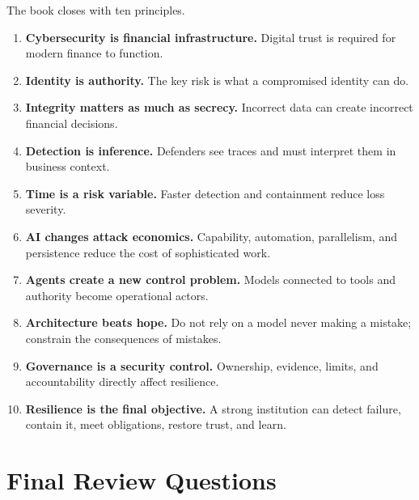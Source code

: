 The book closes with ten principles.

\begin{enumerate}
    \item \textbf{Cybersecurity is financial infrastructure.} Digital trust is required for modern finance to function.
    \item \textbf{Identity is authority.} The key risk is what a compromised identity can do.
    \item \textbf{Integrity matters as much as secrecy.} Incorrect data can create incorrect financial decisions.
    \item \textbf{Detection is inference.} Defenders see traces and must interpret them in business context.
    \item \textbf{Time is a risk variable.} Faster detection and containment reduce loss severity.
    \item \textbf{AI changes attack economics.} Capability, automation, parallelism, and persistence reduce the cost of sophisticated work.
    \item \textbf{Agents create a new control problem.} Models connected to tools and authority become operational actors.
    \item \textbf{Architecture beats hope.} Do not rely on a model never making a mistake; constrain the consequences of mistakes.
    \item \textbf{Governance is a security control.} Ownership, evidence, limits, and accountability directly affect resilience.
    \item \textbf{Resilience is the final objective.} A strong institution can detect failure, contain it, meet obligations, restore trust, and learn.
\end{enumerate}

\section{Final Review Questions}

